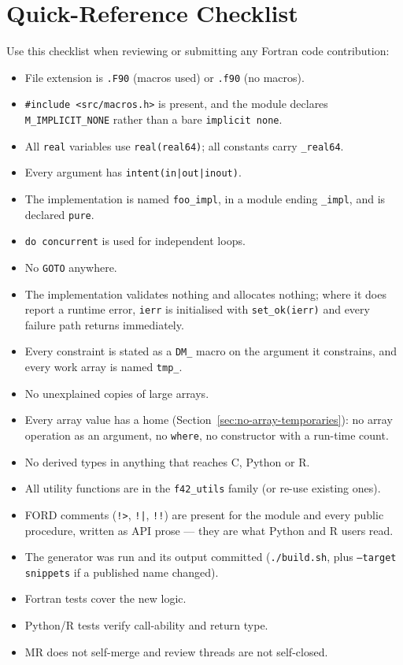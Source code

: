 \documentclass{article}
\begin{document}
\section{Quick-Reference Checklist}

Use this checklist when reviewing or submitting any Fortran code contribution:

\begin{itemize}[label=$\square$]
  \item File extension is \texttt{.F90} (macros used) or \texttt{.f90} (no macros).
  \item \texttt{\#include <src/macros.h>} is present, and the module declares \texttt{M\_IMPLICIT\_NONE} rather than a bare \texttt{implicit none}.
  \item All \texttt{real} variables use \texttt{real(real64)}; all constants carry \texttt{\_real64}.
  \item Every argument has \texttt{intent(in|out|inout)}.
  \item The implementation is named \texttt{foo\_impl}, in a module ending \texttt{\_impl}, and is declared \texttt{pure}.
  \item \texttt{do concurrent} is used for independent loops.
  \item No \texttt{GOTO} anywhere.
  \item The implementation validates nothing and allocates nothing; where it does report a runtime error, \texttt{ierr} is initialised with \texttt{set\_ok(ierr)} and every failure path returns immediately.
  \item Every constraint is stated as a \texttt{DM\_} macro on the argument it constrains, and every work array is named \texttt{tmp\_}.
  \item No unexplained copies of large arrays.
  \item Every array value has a home (Section~\ref{sec:no-array-temporaries}): no array operation as an argument, no \texttt{where}, no constructor with a run-time count.
  \item No derived types in anything that reaches C, Python or R.
  \item All utility functions are in the \texttt{f42\_utils} family (or re-use existing ones).
  \item FORD comments (\texttt{!>}, \texttt{!|}, \texttt{!!}) are present for the module and every public procedure, written as API prose — they are what Python and R users read.
  \item The generator was run and its output committed (\texttt{./build.sh}, plus \texttt{--target snippets} if a published name changed).
  \item Fortran tests cover the new logic.
  \item Python/R tests verify call-ability and return type.
  \item MR does not self-merge and review threads are not self-closed.
\end{itemize}
\end{document}
